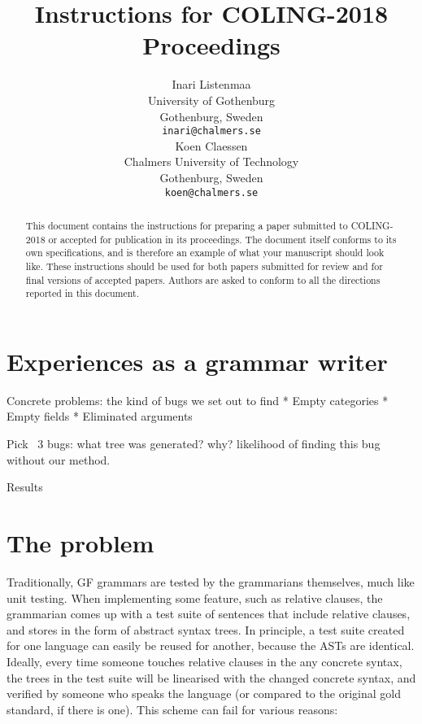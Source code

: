 \documentclass[11pt]{article}
\title{Instructions for COLING-2018 Proceedings}
\author{Inari Listenmaa \\
  University of Gothenburg \\
  Gothenburg, Sweden \\
  {\tt inari@chalmers.se} \\\And
  Koen Claessen \\
  Chalmers University of Technology \\
  Gothenburg, Sweden \\
  {\tt koen@chalmers.se} \\}
\date{}
\begin{document}
\maketitle
\begin{abstract}
  This document contains the instructions for preparing a paper submitted
  to COLING-2018 or accepted for publication in its proceedings. The document itself
  conforms to its own specifications, and is therefore an example of
  what your manuscript should look like. These instructions should be
  used for both papers submitted for review and for final versions of
  accepted papers. Authors are asked to conform to all the directions
  reported in this document.
\end{abstract}






\section{Experiences as a grammar writer}

Concrete problems: the kind of bugs we set out to find
* Empty categories
* Empty fields
* Eliminated arguments

Pick ~3 bugs: 
what tree was generated? why? likelihood of finding this bug without our method.

Results



\section{The problem}

Traditionally, GF grammars are tested by the grammarians themselves,
much like unit testing. When implementing some feature, such as 
relative clauses, the grammarian comes up with a test suite of 
sentences that include relative clauses, and stores in the form of 
abstract syntax trees. In principle, a test suite created for one 
language can easily be reused for another, because the ASTs are 
identical. Ideally, every time someone touches relative clauses 
in the any concrete syntax, the trees in the test suite will be 
linearised with the changed concrete syntax, and verified by someone
who speaks the language (or compared to the original gold standard, 
if there is one). This scheme can fail for various reasons: 
\end{document}
